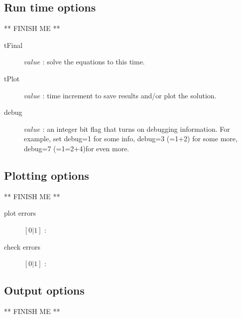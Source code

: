 \documentclass[10pt]{article}
\begin{document}
\subsection{Run time options}

** FINISH ME **

\begin{description}
  \item [\qquad tFinal] $value$ : solve the equations to this time.
  \item [\qquad tPlot] $value$ : time increment to save results and/or plot the solution.
  \item [\qquad debug] $value$ : an integer bit flag that turns on debugging information. For example, set debug=1 for some info, debug=3 (=1+2) for some
    more, debug=7 (=1=2+4)for even more. 
\end{description}

\subsection{Plotting options}

** FINISH ME **

\begin{description}
  \item [\qquad plot errors] $[0|1]$ :
  \item [\qquad check errors] $[0|1]$ :
\end{description}

\subsection{Output options}

** FINISH ME **
\end{document}
